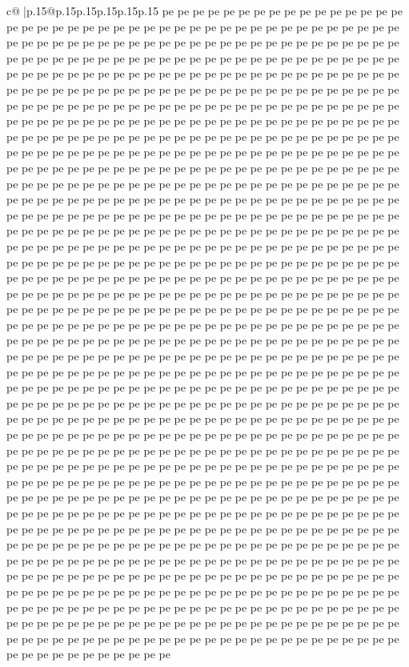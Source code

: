 \documentclass{article}
\begin{document}
{\begin{supertabular}{c@{$\;$}|p{.15\linewidth}@{}p{.15\linewidth}p{.15\linewidth}p{.15\linewidth}p{.15\linewidth}p{.15\linewidth}}
{{{pe pe pe pe pe pe pe pe pe pe pe pe pe pe pe pe pe pe pe pe pe pe pe pe pe pe pe pe pe pe pe pe pe pe pe pe pe pe pe pe pe pe pe pe pe pe pe pe pe pe pe pe pe pe pe pe pe pe pe pe pe pe pe pe pe pe pe pe pe pe pe pe pe pe pe pe pe pe pe pe pe pe pe pe pe pe pe pe pe pe pe pe pe pe pe pe pe pe pe pe pe pe pe pe pe pe pe pe pe pe pe pe pe pe pe pe pe pe pe pe pe pe pe pe pe pe pe pe pe pe pe pe pe pe pe pe pe pe pe pe pe pe pe pe pe pe pe pe pe pe pe pe pe pe pe pe pe pe pe pe pe pe pe pe pe pe pe pe pe pe pe pe pe pe pe pe pe pe pe pe pe pe pe pe pe pe pe pe pe pe pe pe pe pe pe pe pe pe pe pe pe pe pe pe pe pe pe pe pe pe pe pe pe pe pe pe pe pe pe pe pe pe pe pe pe pe pe pe pe pe pe pe pe pe pe pe pe pe pe pe pe pe pe pe pe pe pe pe pe pe pe pe pe pe pe pe pe pe pe pe pe pe pe pe pe pe pe pe pe pe pe pe pe pe pe pe pe pe pe pe pe pe pe pe pe pe pe pe pe pe pe pe pe pe pe pe pe pe pe pe pe pe pe pe pe pe pe pe pe pe pe pe pe pe pe pe pe pe pe pe pe pe pe pe pe pe pe pe pe pe pe pe pe pe pe pe pe pe pe pe pe pe pe pe pe pe pe pe pe pe pe pe pe pe pe pe pe pe pe pe pe pe pe pe pe pe pe pe pe pe pe pe pe pe pe pe pe pe pe pe pe pe pe pe pe pe pe pe pe pe pe pe pe pe pe pe pe pe pe pe pe pe pe pe pe pe pe pe pe pe pe pe pe pe pe pe pe pe pe pe pe pe pe pe pe pe pe pe pe pe pe pe pe pe pe pe pe pe pe pe pe pe pe pe pe pe pe pe pe pe pe pe pe pe pe pe pe pe pe pe pe pe pe pe pe pe pe pe pe pe pe pe pe pe pe pe pe pe pe pe pe pe pe pe pe pe pe pe pe pe pe pe pe pe pe pe pe pe pe pe pe pe pe pe pe pe pe pe pe pe pe pe pe pe pe pe pe pe pe pe pe pe pe pe pe pe pe pe pe pe pe pe pe pe pe pe pe pe pe pe pe pe pe pe pe pe pe pe pe pe pe pe pe pe pe pe pe pe pe pe pe pe pe pe pe pe pe pe pe pe pe pe pe pe pe pe pe pe pe pe pe pe pe pe pe pe pe pe pe pe pe pe pe pe pe pe pe pe pe pe pe pe pe pe pe pe pe pe pe pe pe pe pe pe pe pe pe pe pe pe pe pe pe pe pe pe pe pe pe pe pe pe pe pe pe pe pe pe pe pe pe pe pe pe pe pe pe pe pe pe pe pe pe pe pe pe pe pe pe pe pe pe pe pe pe pe pe pe pe pe pe pe pe pe pe pe pe pe pe pe pe pe pe pe pe pe pe pe pe pe pe pe pe pe pe pe pe pe pe pe pe pe pe pe pe pe pe pe pe pe pe pe pe pe pe pe pe pe pe pe pe pe pe pe pe pe pe pe pe pe pe pe pe pe pe pe pe pe pe pe pe pe pe pe pe pe pe pe pe pe pe pe pe pe pe pe pe pe pe pe pe pe pe pe pe pe pe pe pe pe pe pe pe pe pe pe pe pe pe pe pe pe pe pe pe pe pe pe pe pe pe pe pe pe pe pe pe pe pe pe pe pe pe pe pe pe pe pe pe pe pe pe pe pe pe pe pe pe pe pe pe pe pe pe pe pe pe pe pe pe pe pe pe pe pe pe pe pe pe pe pe pe pe pe pe pe pe pe pe pe pe pe pe pe pe pe pe pe pe pe pe pe pe pe pe pe pe pe pe pe pe pe pe pe pe pe pe pe pe pe pe pe pe pe pe pe pe pe pe pe pe pe pe pe pe pe pe pe pe pe pe pe pe pe pe pe pe pe pe pe pe pe pe pe pe pe pe pe pe pe pe pe pe pe pe pe pe pe pe pe pe pe pe pe pe pe pe pe pe pe pe pe pe pe pe pe pe pe pe pe pe pe pe pe pe pe pe pe pe pe pe pe pe pe pe pe pe pe pe pe pe pe pe pe pe pe pe pe pe pe pe pe pe pe pe pe pe pe pe pe pe pe pe pe pe pe pe pe pe pe pe pe pe pe pe pe pe pe pe pe pe pe pe pe pe pe pe pe pe pe pe pe pe pe pe pe pe pe pe pe pe pe pe pe pe pe pe pe pe pe pe pe pe pe pe pe pe pe pe pe pe pe pe pe pe pe pe pe pe pe pe pe pe pe pe pe pe }}}
\end{supertabular}}
\end{document}
